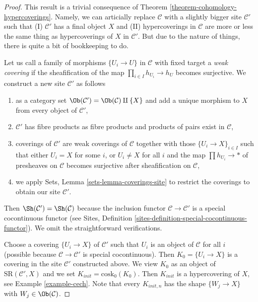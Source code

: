 \begin{proof}
This result is a trivial consequence of
Theorem \ref{theorem-cohomology-hypercoverings}.
Namely, we can articially replace $\mathcal{C}$ with a slightly
bigger site $\mathcal{C}'$ such that
(I) $\mathcal{C}'$ has a final object $X$ and (II)
hypercoverings in $\mathcal{C}$ are more or less the
same thing as hypercoverings of $X$ in $\mathcal{C}'$.
But due to the nature of things, there is quite a bit of
bookkeeping to do.

\medskip\noindent
Let us call a family of morphisms $\{U_i \to U\}$ in $\mathcal{C}$
with fixed target a {\it weak covering} if the sheafification of the
map $\prod_{i \in I} h_{U_i} \to h_U$ becomes surjective.
We construct a new site $\mathcal{C}'$ as follows
\begin{enumerate}
\item as a category set $\Ob(\mathcal{C}') = \Ob(\mathcal{C}) \amalg \{X\}$
and add a unique morphism to $X$ from every object of $\mathcal{C}'$,
\item $\mathcal{C}'$ has fibre products as fibre products and products
of pairs exist in $\mathcal{C}$,
\item coverings of $\mathcal{C}'$ are weak coverings of $\mathcal{C}$
together with those $\{U_i \to X\}_{i \in I}$ such that either $U_i = X$
for some $i$, or $U_i \not = X$ for all $i$ and the map
$\prod h_{U_i} \to *$ of presheaves on $\mathcal{C}$ becomes
surjective after sheafification on $\mathcal{C}$,
\item we apply Sets, Lemma \ref{sets-lemma-coverings-site}
to restrict the coverings to obtain our site $\mathcal{C}'$.
\end{enumerate}
Then $\Sh(\mathcal{C}') = \Sh(\mathcal{C})$ because the inclusion
functor $\mathcal{C} \to \mathcal{C}'$ is a special cocontinuous functor
(see Sites, Definition \ref{sites-definition-special-cocontinuous-functor}).
We omit the straightforward verifications.

\medskip\noindent
Choose a covering $\{U_i \to X\}$ of $\mathcal{C}'$ such that $U_i$ is an
object of $\mathcal{C}$ for all $i$ (possible because
$\mathcal{C} \to \mathcal{C}'$ is special cocontinuous).
Then $K_0 = \{U_i \to X\}$ is a covering in the
site $\mathcal{C}'$ constructed above. We view $K_0$ as an object of
$\text{SR}(\mathcal{C}', X)$ and we set $K_{init} = \text{cosk}_0(K_0)$.
Then $K_{init}$ is a hypercovering of $X$, see
Example \ref{example-cech}. Note that every $K_{init, n}$ has the shape
$\{W_j \to X\}$ with $W_j \in \Ob(\mathcal{C})$.


\end{proof}
